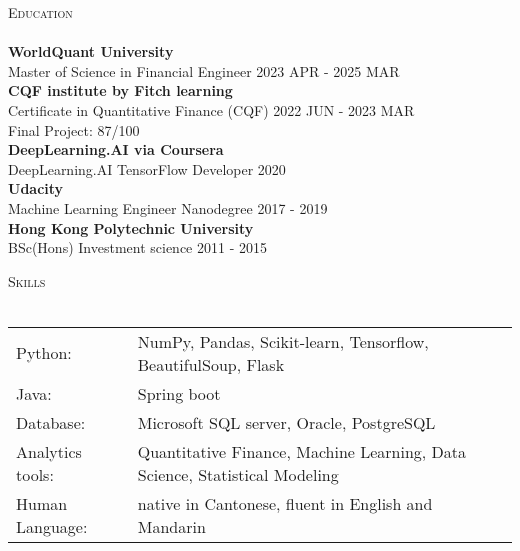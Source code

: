 \documentclass[a4paper]{article}
\newcommand{\lineunder} {
    \vspace*{-8pt} \\
    \hspace*{-18pt} \hrulefill \\
}
\newcommand{\header} [1] {
    {\hspace*{-18pt}\vspace*{6pt} \textsc{#1}}
    \vspace*{-6pt} \lineunder
}
\begin{document}
\header{Education}
\textbf{WorldQuant University}\\
Master of Science in Financial Engineer \hfill 2023 APR - 2025 MAR\\
\vspace{2mm}
\textbf{CQF institute by Fitch learning}\\
Certificate in Quantitative Finance (CQF) \hfill 2022 JUN - 2023 MAR\\
Final Project: 87/100\\
\vspace{2mm}
\textbf{DeepLearning.AI via Coursera}\\
DeepLearning.AI TensorFlow Developer \hfill 2020\\
\vspace{2mm}
\textbf{Udacity}\\
Machine Learning Engineer Nanodegree \hfill 2017 - 2019\\
\vspace{2mm}
\textbf{Hong Kong Polytechnic University}\\
BSc(Hons) Investment science \hfill 2011 - 2015\\
\vspace{2mm}

\header{Skills}
\begin{tabular}{ l l }
	Python:          & NumPy, Pandas, Scikit-learn, Tensorflow, BeautifulSoup, Flask                        \\
	Java:            & Spring boot                                                                \\
	Database:        & Microsoft SQL server, Oracle, PostgreSQL                                   \\
	Analytics tools: & Quantitative Finance, Machine Learning, Data Science, Statistical Modeling \\
        Human Language:  & native in Cantonese, fluent in English and Mandarin
\end{tabular}
\vspace{2mm}





\ 
\end{document}
